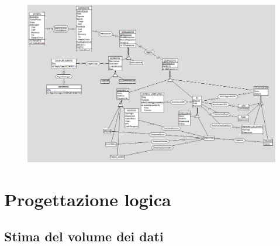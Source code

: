 \documentclass[a4paper,12pt]{report}
\begin{document}
\begin{figure}
    \includegraphics{images/schema-ER-completo.png}
\end{figure}


\chapter{Progettazione logica}

\section{Stima del volume dei dati}
\end{document}
